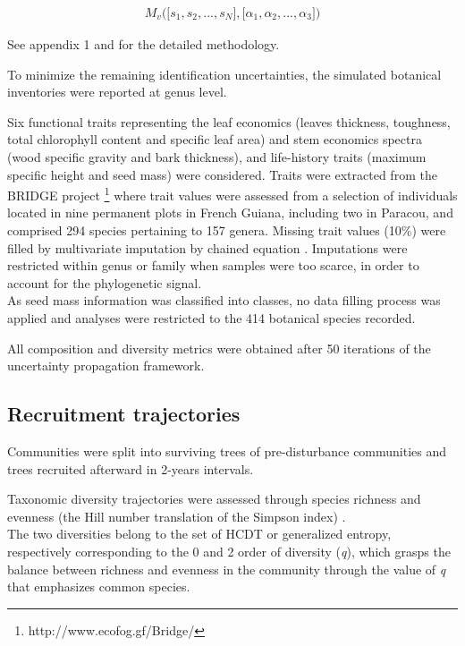 \documentclass[fleqn,10pt]{ArtEcoFoG} %
\begin{document}
\begin{align}
M_v\Big(\big[s_1, s_2,..., s_N\big],\big[\alpha_1, \alpha_2,..., \alpha_3\big]\Big) \nonumber
\end{align}

See appendix 1 and \citet{Aubry-Kientz2013} for the detailed
methodology.

To minimize the remaining identification uncertainties, the simulated
botanical inventories were reported at genus level.

Six functional traits representing the leaf economics (leaves thickness,
toughness, total chlorophyll content and specific leaf area) and stem
economics spectra (wood specific gravity and bark thickness), and
life-history traits (maximum specific height and seed mass) were
considered. Traits were extracted from the BRIDGE project \footnote{http://www.ecofog.gf/Bridge/}
where trait values were assessed from a selection of individuals located
in nine permanent plots in French Guiana, including two in Paracou, and
comprised 294 species pertaining to 157 genera. Missing trait values
(10\%) were filled by multivariate imputation by chained equation
\citep{Mice2011}. Imputations were restricted within genus or family
when samples were too scarce, in order to account for the phylogenetic
signal.\\
As seed mass information was classified into classes, no data filling
process was applied and analyses were restricted to the 414 botanical
species recorded.

All composition and diversity metrics were obtained after 50 iterations
of the uncertainty propagation framework.

\subsection{Recruitment trajectories}\label{recruitment-trajectories}

Communities were split into surviving trees of pre-disturbance
communities and trees recruited afterward in 2-years intervals.

Taxonomic diversity trajectories were assessed through species richness
and evenness (the Hill number translation of the Simpson index)
\citep{chao2015, Marcon2015b}.\\
The two diversities belong to the set of HCDT or generalized entropy,
respectively corresponding to the 0 and 2 order of diversity (\emph{q}),
which grasps the balance between richness and evenness in the community
through the value of \emph{q} that emphasizes common species.
\end{document}
